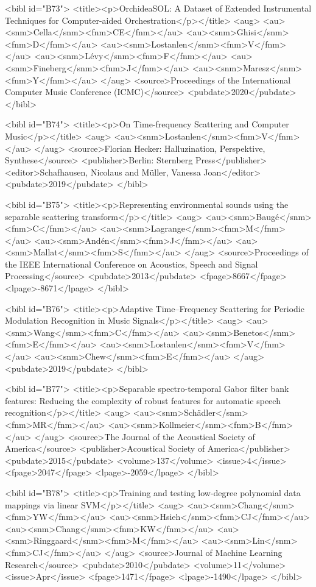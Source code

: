 \documentclass{bmcart}
\begin{document}
\begin{backmatter}
{<bibl id="B73">
  <title><p>OrchideaSOL: A Dataset of Extended Instrumental Techniques for
  Computer-aided Orchestration</p></title>
  <aug>
    <au><snm>Cella</snm><fnm>CE</fnm></au>
    <au><snm>Ghisi</snm><fnm>D</fnm></au>
    <au><snm>Lostanlen</snm><fnm>V</fnm></au>
    <au><snm>L{\'e}vy</snm><fnm>F</fnm></au>
    <au><snm>Fineberg</snm><fnm>J</fnm></au>
    <au><snm>Maresz</snm><fnm>Y</fnm></au>
  </aug>
  <source>Proceedings of the International Computer Music Conference
  (ICMC)</source>
  <pubdate>2020</pubdate>
</bibl>

<bibl id="B74">
  <title><p>On Time-frequency Scattering and Computer Music</p></title>
  <aug>
    <au><snm>Lostanlen</snm><fnm>V</fnm></au>
  </aug>
  <source>Florian Hecker: Halluzination, Perspektive, Synthese</source>
  <publisher>Berlin: Sternberg Press</publisher>
  <editor>Schafhausen, Nicolaus and M\"{u}ller, Vanessa Joan</editor>
  <pubdate>2019</pubdate>
</bibl>

<bibl id="B75">
  <title><p>Representing environmental sounds using the separable scattering
  transform</p></title>
  <aug>
    <au><snm>Baug{\'e}</snm><fnm>C</fnm></au>
    <au><snm>Lagrange</snm><fnm>M</fnm></au>
    <au><snm>And{\'e}n</snm><fnm>J</fnm></au>
    <au><snm>Mallat</snm><fnm>S</fnm></au>
  </aug>
  <source>Proceedings of the IEEE International Conference on Acoustics, Speech
  and Signal Processing</source>
  <pubdate>2013</pubdate>
  <fpage>8667</fpage>
  <lpage>-8671</lpage>
</bibl>

<bibl id="B76">
  <title><p>Adaptive Time--Frequency Scattering for Periodic Modulation
  Recognition in Music Signals</p></title>
  <aug>
    <au><snm>Wang</snm><fnm>C</fnm></au>
    <au><snm>Benetos</snm><fnm>E</fnm></au>
    <au><snm>Lostanlen</snm><fnm>V</fnm></au>
    <au><snm>Chew</snm><fnm>E</fnm></au>
  </aug>
  <pubdate>2019</pubdate>
</bibl>

<bibl id="B77">
  <title><p>Separable spectro-temporal Gabor filter bank features: Reducing the
  complexity of robust features for automatic speech recognition</p></title>
  <aug>
    <au><snm>Sch{\"a}dler</snm><fnm>MR</fnm></au>
    <au><snm>Kollmeier</snm><fnm>B</fnm></au>
  </aug>
  <source>The Journal of the Acoustical Society of America</source>
  <publisher>Acoustical Society of America</publisher>
  <pubdate>2015</pubdate>
  <volume>137</volume>
  <issue>4</issue>
  <fpage>2047</fpage>
  <lpage>-2059</lpage>
</bibl>

<bibl id="B78">
  <title><p>Training and testing low-degree polynomial data mappings via linear
  SVM</p></title>
  <aug>
    <au><snm>Chang</snm><fnm>YW</fnm></au>
    <au><snm>Hsieh</snm><fnm>CJ</fnm></au>
    <au><snm>Chang</snm><fnm>KW</fnm></au>
    <au><snm>Ringgaard</snm><fnm>M</fnm></au>
    <au><snm>Lin</snm><fnm>CJ</fnm></au>
  </aug>
  <source>Journal of Machine Learning Research</source>
  <pubdate>2010</pubdate>
  <volume>11</volume>
  <issue>Apr</issue>
  <fpage>1471</fpage>
  <lpage>-1490</lpage>
</bibl>

}
\end{backmatter}
\end{document}
